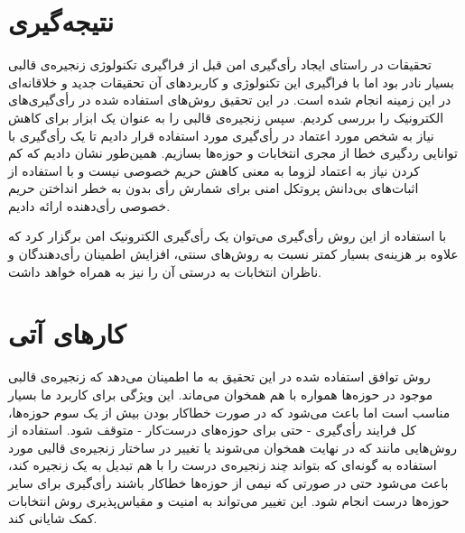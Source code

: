 \section{نتیجه‌گیری}
تحقیقات در راستای ایجاد رأی‌گیری امن قبل از فراگیری تکنولوژی زنجیره‌ی قالبی بسیار نادر بود اما با فراگیری این تکنولوژی و کاربرد‌های آن تحقیقات جدید و خلاقانه‌ای در این زمینه انجام شده است. در این تحقیق روش‌های استفاده شده در رأی‌گیری‌های الکترونیک را بررسی کردیم. سپس زنجیره‌ی قالبی را به عنوان یک ابزار برای کاهش نیاز به شخص مورد اعتماد در رأی‌گیری مورد استفاده قرار دادیم تا یک رأی‌گیری با توانایی ردگیری خطا از مجری انتخابات و حوزه‌ها بسازیم. همین‌طور نشان دادیم که کم کردن نیاز به اعتماد لزوما به معنی کاهش حریم خصوصی نیست و با استفاده از اثبات‌های بی‌دانش پروتکل‌ امنی برای شمارش رأی بدون به خطر انداختن حریم خصوصی رأی‌دهنده ارائه دادیم. 
\par 
با استفاده از این روش رأی‌گیری می‌توان یک رأی‌گیری الکترونیک امن برگزار کرد که علاوه بر هزینه‌ی بسیار کمتر نسبت به روش‌های سنتی، افزایش اطمینان رأی‌دهندگان و ناظران انتخابات به درستی آن را نیز به همراه خواهد داشت. 

\section{کار‌های آتی} 
روش توافق استفاده شده در این تحقیق به ما اطمینان می‌دهد که زنجیره‌ی قالبی موجود در حوزه‌ها همواره با هم همخوان می‌ماند. این ویژگی برای کاربرد ما بسیار مناسب است اما باعث می‌شود که در صورت خطاکار بودن بیش از یک سوم حوزه‌‌ها، کل فرایند رأی‌گیری - حتی برای حوزه‌های درست‌کار - متوقف شود. استفاده از روش‌هایی مانند  که در نهایت همخوان می‌شوند یا تغییر در ساختار زنجیره‌ی قالبی مورد استفاده به گونه‌ای که بتواند چند زنجیره‌ی درست را با هم تبدیل به یک زنجیره کند، باعث می‌شود حتی در صورتی که نیمی از حوزه‌ها خطاکار باشند رأی‌گیری برای ‌سایر حوزه‌ها درست انجام شود. این تغییر می‌تواند به امنیت و مقیاس‌پذیری روش انتخابات کمک شایانی کند. 





